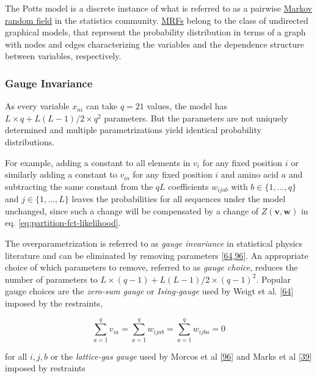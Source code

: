 \documentclass[11pt,a4paper,twoside]{book}
\renewcommand{\v}{\mathbf{v}}
\newcommand{\via}{v_{ia}}
\newcommand{\w}{\mathbf{w}}
\newcommand{\wijab}{w_{ijab}}
\theoremstyle{definition}
\theoremstyle{definition}
\theoremstyle{remark}
\begin{document}
The Potts model is a discrete instance of what is referred to as a
pairwise \protect\hyperlink{abbrev}{Markov random field} in the
statistics community. \protect\hyperlink{abbrev}{MRFs} belong to the
class of undirected graphical models, that represent the probability
distribution in terms of a graph with nodes and edges characterizing the
variables and the dependence structure between variables, respectively.

\subsubsection{Gauge Invariance}\label{gauge-invariance}

As every variable \(x_{ni}\) can take \(q=21\) values, the model has
\(L \! \times \! q + L(L-1)/2 \! \times \! q^2\) parameters. But the
parameters are not uniquely determined and multiple parametrizations
yield identical probability distributions.

For example, adding a constant to all elements in \(v_i\) for any fixed
position \(i\) or similarly adding a constant to \(\via\) for any fixed
position \(i\) and amino acid \(a\) and subtracting the same constant
from the \(qL\) coefficients \(\wijab\) with \(b \in \{1, \ldots, q\}\)
and \(j \in \{1, \ldots, L \}\) leaves the probabilities for all
sequences under the model unchanged, since such a change will be
compensated by a change of \(Z(\v, \w)\) in eq.
\eqref{eq:partition-fct-likelihood}.

The overparametrization is referred to as \emph{gauge invariance} in
statistical physics literature and can be eliminated by removing
parameters
{[}\protect\hyperlink{ref-Weigt2009}{64},\protect\hyperlink{ref-Morcos2011}{96}{]}.
An appropriate choice of which parameters to remove, referred to as
\emph{gauge choice}, reduces the number of parameters to
\(L \! \times \! (q-1) + L(L-1)/2 \! \times \! (q-1)^2\). Popular gauge
choices are the \emph{zero-sum gauge} or \emph{Ising-gauge} used by
Weigt et al. {[}\protect\hyperlink{ref-Weigt2009}{64}{]} imposed by the
restraints,

\begin{equation}
    \sum_{a=1}^{q} v_{ia} = \sum_{a=1}^{q} \wijab = \sum_{a=1}^{q} w_{ijba} = 0
\label{eq:zero-sum-gauge}
\end{equation}

for all \(i,j,b\) or the \emph{lattice-gas gauge} used by Morcos et al
{[}\protect\hyperlink{ref-Morcos2011}{96}{]} and Marks et al
{[}\protect\hyperlink{ref-Marks2011}{39}{]} imposed by restraints
\end{document}
